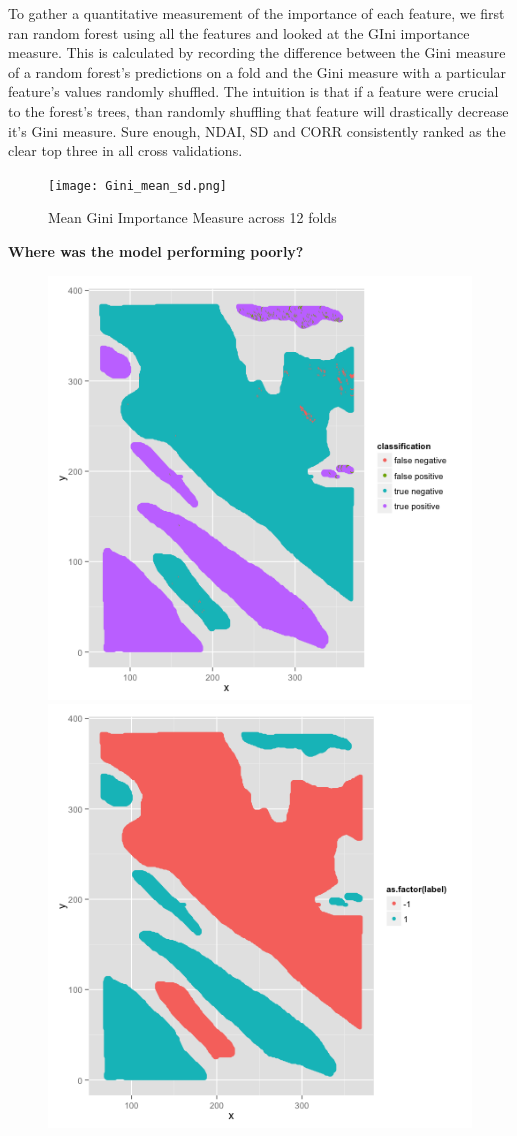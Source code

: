 \documentclass{article}\usepackage[]{graphicx}\usepackage[]{color}
\begin{document}
To gather a quantitative measurement of the importance of each feature, we first ran random forest using all the features and looked at the GIni importance measure.  This is calculated by recording the difference between the Gini measure of a random forest's predictions on a fold and the Gini measure with a particular feature's values randomly shuffled.  The intuition is that if a feature were crucial to the forest's trees, than randomly shuffling that feature will drastically decrease it's Gini measure.  Sure enough, NDAI, SD and CORR   consistently ranked as the clear top three in all cross validations. \\
\begin{figure}
\centering
\texttt{[image: Gini\_mean\_sd.png]}
\caption{Mean Gini Importance Measure across 12 folds}
\end{figure}
{\bf Where was the model performing poorly?}

  \begin{figure}[H]
  \includegraphics[width=\linewidth, height = 180pts ]{classification_1.png}
\endminipage\hfill
{}
  \includegraphics[width=\linewidth, height = 180pts]{label_1.png}
\endminipage\hfill
\end{figure}
\end{document}
